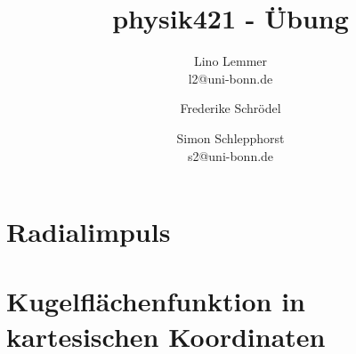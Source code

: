 

\setcounter{thezettel}{11}
\renewcommand\thesection{\arabic{thezettel}.\arabic{section}}



\title{physik421 - Übung }
\author{Lino Lemmer \\ \small{l2@uni-bonn.de} \and Frederike Schrödel \and Simon Schlepphorst\\ \small{s2@uni-bonn.de}}


\maketitle

\section{Radialimpuls} %
\label{sec:Radialimpuls}
 

\section{Kugelflächenfunktion in kartesischen Koordinaten} %
\label{sec:Kugelflächenfunktion in kartesischen Koordinaten}

